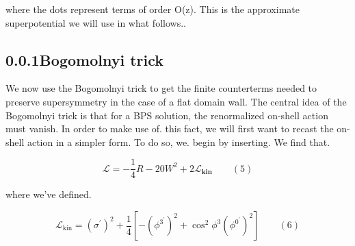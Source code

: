 \documentclass{article}
\begin{document}
where the dots represent terms of order O(z). This is the approximate superpotential we
will use in what follows..


\subsection*{0.0.1Bogomolnyi trick}


We now use the Bogomolnyi trick to get the finite counterterms needed to preserve supersymmetry in the case of a flat domain wall. The central idea of the Bogomolnyi trick is that
for a BPS solution, the renormalized on-shell action must vanish. In order to make use of.
this fact, we will first want to recast the on-shell action in a simpler form. To do so, we.
begin by inserting. We find that.


\begin{equation}
\mathcal { L } = - \frac { 1 } { 4 } R - 2 0 W ^ { 2 } + 2 \mathcal { L } _ \mathbf { k i n } \qquad ( 5 )
\end{equation}


where we've defined.


\begin{equation}
{ \mathcal { L } } _ { \mathrm { k i n } } = ( \sigma ^ { \prime } ) ^ { 2 } + { \frac { 1 } { 4 } } \left [ - ( { \phi ^ { 3 ^ { \prime } } } ) ^ { 2 } + \cos ^ { 2 } \phi ^ { 3 } ( { \phi ^ { 0 ^ { \prime } } } ) ^ { 2 } \right ] \qquad ( 6 )
\end{equation}
\end{document}
